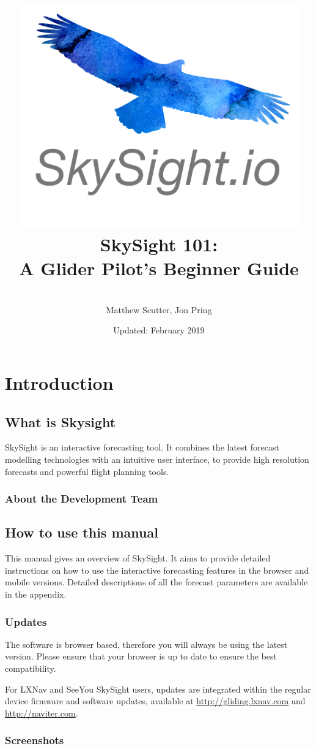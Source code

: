 \documentclass[11pt,a4paper]{article}
\title{\includegraphics[width=12cm]{images/logo.png}\\[1cm]SkySight 101: \\[0.5cm]A Glider Pilot's Beginner Guide}
\author{\\Matthew Scutter, Jon Pring}
\date{Updated: February 2019}
\begin{document}
\begin{titlepage}
\maketitle
\end{titlepage}

\tableofcontents
\pagebreak

\section{Introduction}
\subsection{What is Skysight}

SkySight is an interactive forecasting tool. It combines the latest forecast modelling technologies with an intuitive user interface, to provide high resolution forecasts and powerful flight planning tools.


\subsubsection{About the Development Team}


\subsection{How to use this manual}

This manual gives an overview of SkySight. It aims to provide detailed instructions on how to use the interactive forecasting features in the browser and mobile versions. Detailed descriptions of all the forecast parameters are available in the appendix.



\subsubsection{Updates}

The software is browser based, therefore you will always be using the latest version. Please ensure that your browser is up to date to ensure the best compatibility.

For LXNav and SeeYou SkySight users, updates are integrated within the regular device firmware and software updates, available at \url{http://gliding.lxnav.com} and \url{http://naviter.com}.

\subsubsection{Screenshots}
\end{document}
